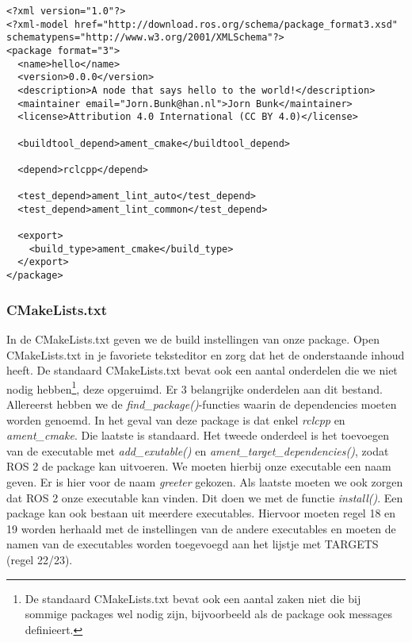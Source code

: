 \begin{lstlisting}[style=XML, firstnumber=0]
<?xml version="1.0"?>
<?xml-model href="http://download.ros.org/schema/package_format3.xsd" schematypens="http://www.w3.org/2001/XMLSchema"?>
<package format="3">
  <name>hello</name>
  <version>0.0.0</version>
  <description>A node that says hello to the world!</description>
  <maintainer email="Jorn.Bunk@han.nl">Jorn Bunk</maintainer>
  <license>Attribution 4.0 International (CC BY 4.0)</license>

  <buildtool_depend>ament_cmake</buildtool_depend>

  <depend>rclcpp</depend>

  <test_depend>ament_lint_auto</test_depend>
  <test_depend>ament_lint_common</test_depend>

  <export>
    <build_type>ament_cmake</build_type>
  </export>
</package>
\end{lstlisting}
\subsubsection{CMakeLists.txt}
In de CMakeLists.txt geven we de build instellingen van onze package. Open CMakeLists.txt in je favoriete teksteditor en zorg dat het de onderstaande inhoud heeft. De standaard CMakeLists.txt bevat ook een aantal onderdelen die we niet nodig hebben\footnote{De standaard CMakeLists.txt bevat ook een aantal zaken niet die bij sommige packages wel nodig zijn, bijvoorbeeld als de package ook messages definieert.}, deze opgeruimd. Er 3 belangrijke onderdelen aan dit bestand. Allereerst hebben we de \textit{find\_package()}-functies waarin de dependencies moeten worden genoemd. In het geval van deze package is dat enkel \textit{rclcpp} en \textit{ament\_cmake}. Die laatste is standaard. Het tweede onderdeel is het toevoegen van de executable met \textit{add\_exutable()} en \textit{ament\_target\_dependencies()}, zodat ROS 2 de package kan uitvoeren. We moeten hierbij onze executable een naam geven. Er is hier voor de naam \textit{greeter} gekozen. Als laatste moeten we ook zorgen dat ROS 2 onze executable kan vinden. Dit doen we met de functie \textit{install()}. Een package kan ook bestaan uit meerdere executables. Hiervoor moeten regel 18 en 19 worden herhaald met de instellingen van de andere executables en moeten de namen van de executables worden toegevoegd aan het lijstje met TARGETS (regel 22/23).

